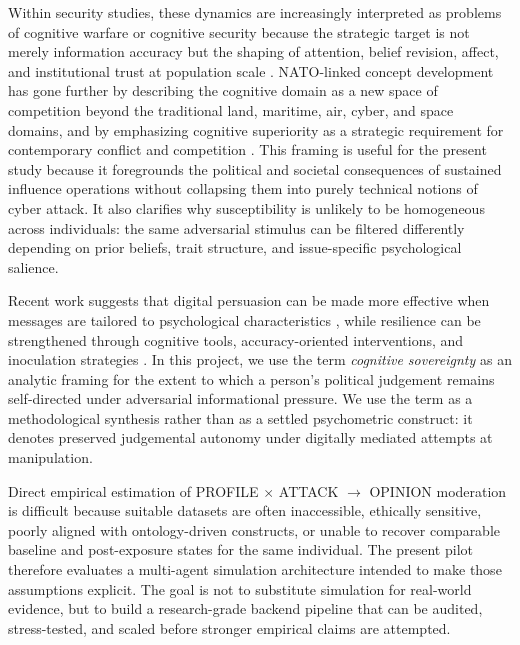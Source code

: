 \documentclass[11pt]{article}
\begin{document}
Within security studies, these dynamics are increasingly interpreted as problems of cognitive warfare or cognitive security because the strategic target is not merely information accuracy but the shaping of attention, belief revision, affect, and institutional trust at population scale \citep{hung2022china,miller2023cognitive}. NATO-linked concept development has gone further by describing the cognitive domain as a new space of competition beyond the traditional land, maritime, air, cyber, and space domains, and by emphasizing cognitive superiority as a strategic requirement for contemporary conflict and competition \citep{nato2021cognitive,paulauskas2024cognitive}. This framing is useful for the present study because it foregrounds the political and societal consequences of sustained influence operations without collapsing them into purely technical notions of cyber attack. It also clarifies why susceptibility is unlikely to be homogeneous across individuals: the same adversarial stimulus can be filtered differently depending on prior beliefs, trait structure, and issue-specific psychological salience.

Recent work suggests that digital persuasion can be made more effective when messages are tailored to psychological characteristics \citep{matz2017psychological}, while resilience can be strengthened through cognitive tools, accuracy-oriented interventions, and inoculation strategies \citep{kozyreva2020citizens,pennycook2021accuracy,roozenbeek2022inoculation}. In this project, we use the term \textit{cognitive sovereignty} as an analytic framing for the extent to which a person's political judgement remains self-directed under adversarial informational pressure. We use the term as a methodological synthesis rather than as a settled psychometric construct: it denotes preserved judgemental autonomy under digitally mediated attempts at manipulation.

Direct empirical estimation of PROFILE $\times$ ATTACK $\rightarrow$ OPINION moderation is difficult because suitable datasets are often inaccessible, ethically sensitive, poorly aligned with ontology-driven constructs, or unable to recover comparable baseline and post-exposure states for the same individual. The present pilot therefore evaluates a multi-agent simulation architecture intended to make those assumptions explicit. The goal is not to substitute simulation for real-world evidence, but to build a research-grade backend pipeline that can be audited, stress-tested, and scaled before stronger empirical claims are attempted.
\end{document}

